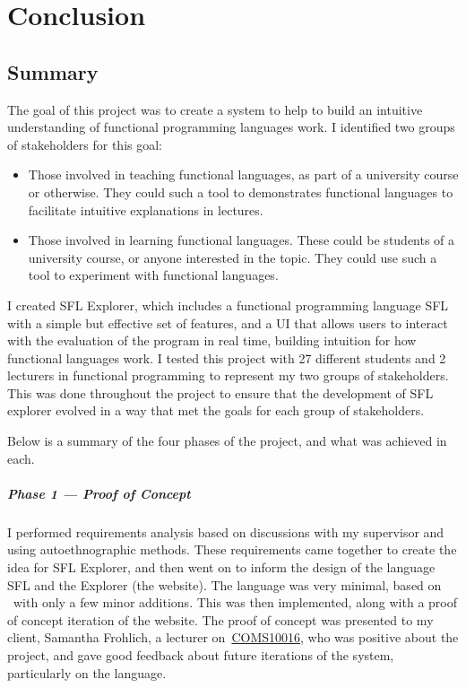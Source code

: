 \chapter{Conclusion}
\label{chap:conclusion}
\section{Summary}
The goal of this project was to create a system to help to build an intuitive understanding of functional programming languages work. I identified two groups of stakeholders for this goal:

\begin{itemize}
    \item Those involved in teaching functional languages, as part of a university course or otherwise. They could such a tool to demonstrates functional languages to facilitate intuitive explanations in lectures.
    \item Those involved in learning functional languages. These could be students of a university course, or anyone interested in the topic. They could use such a tool to experiment with functional languages. 
\end{itemize}

\noindent I created SFL Explorer, which includes a functional programming language \ac{SFL} with a simple but effective set of features, and a UI that allows users to interact with the evaluation of the program in real time, building intuition for how functional languages work. I tested this project with 27 different students and 2 lecturers in functional programming to represent my two groups of stakeholders. This was done throughout the project to ensure that the development of SFL explorer evolved in a way that met the goals for each group of stakeholders. 

Below is a summary of the four phases of the project, and what was achieved in each. 
\paragraph{Phase 1 --- Proof of Concept} I performed requirements analysis based on discussions with my supervisor and using autoethnographic methods. These requirements came together to create the idea for SFL Explorer, and then went on to inform the design of the language \ac{SFL} and the Explorer (the website). The language was very minimal, based on \lcalc~with only a few minor additions. This was then implemented, along with a proof of concept iteration of the website. The proof of concept was presented to my client, Samantha Frohlich, a lecturer on~\hyperref[COMS10016]{COMS10016}, who was positive about the project, and gave good feedback about future iterations of the system, particularly on the language. 
